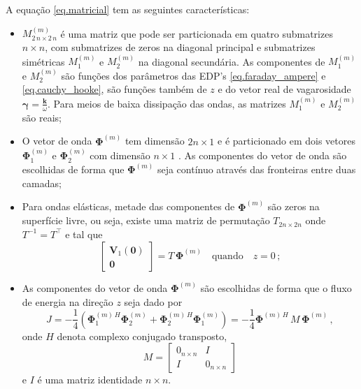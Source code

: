 A equa\c{c}\~ao \ref{eq.matricial} tem as seguintes caracter\'isticas:
\begin{itemize}
\item $M^{(m)}_{2\,n\times2\,n}$ \'e uma matriz que pode ser particionada em quatro submatrizes $n\times n$, com submatrizes de zeros na diagonal principal e submatrizes sim\'etricas $M_1^{(m)}$ e $M_2^{(m)}$ na diagonal secund\'aria. As componentes de $M_1^{(m)}$ e $M_2^{(m)}$ s\~ao fun\c{c}\~oes dos par\^ametros das EDP's \ref{eq.faraday_ampere} e \ref{eq.cauchy_hooke}, s\~ao fun\c{c}\~oes tamb\'em de $z$ e do vetor real de vagarosidade $\mathbf{\gamma}=\frac{\mathbf{k}}{\omega}$. Para meios de baixa dissipa\c{c}\~ao das ondas, as matrizes $M_1^{(m)}$ e $M_2^{(m)}$ s\~ao reais; 
\item O vetor de onda $\mathbf{\Phi}^{(m)}$ tem dimens\~ao $2n\times1$ e \'e particionado em dois vetores $\mathbf{\Phi}^{(m)}_1$ e $\mathbf{\Phi}^{(m)}_2$ com dimens\~ao $n\times1$ . As componentes do vetor de onda s\~ao escolhidas de forma que $\mathbf{\Phi}^{(m)}$ seja cont\'inuo atrav\'es das fronteiras entre duas camadas;
\item  Para ondas el\'asticas, metade das componentes de $\mathbf{\Phi}^{(m)}$ s\~ao zeros na superf\'icie livre, ou seja, existe uma matriz de permuta\c{c}\~ao $T_{2n\times2n}$ onde $T^{-1}=T^\top$ e tal que
\begin{equation*}
\begin{bmatrix}
\mathbf{V}_1(\mathbf{0})\\
\mathbf{0}
\end{bmatrix}
=T\,\mathbf{\Phi}^{(m)}\quad\text{quando}\quad z = 0\,;
\end{equation*}
\item As componentes do vetor de onda $\mathbf{\Phi}^{(m)}$ s\~ao escolhidas de forma que o fluxo de energia na dire\c{c}\~ao $z$ seja dado por
\begin{equation*}
J=-\frac{1}{4}(\mathbf{\Phi}_1^{(m)\,H}\mathbf{\Phi}^{(m)}_2+\mathbf{\Phi}_2^{(m)\,H}\mathbf{\Phi}^{(m)}_1)=-\frac{1}{4}\mathbf{\Phi}^{(m)\,H}\,M\, \mathbf{\Phi}^{(m)}\,,
\end{equation*}
onde $H$ denota complexo conjugado transposto,
\begin{equation*}
M=
\begin{bmatrix}
0_{n\times n}&I\\
I&0_{n\times n}
\end{bmatrix}
\end{equation*}
e $I$ \'e uma matriz identidade $n\times n$.
\end{itemize}

